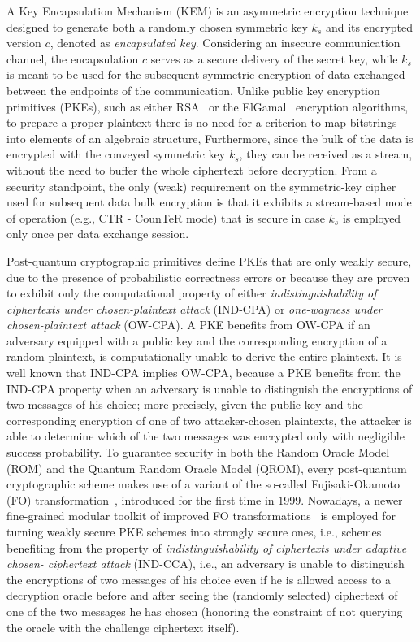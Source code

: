 A Key Encapsulation Mechanism (KEM) is an asymmetric encryption technique 
designed to generate both a randomly chosen symmetric key $k_s$ and its 
encrypted version $c$, denoted as {\em encapsulated key}. 
Considering an insecure communication channel, the encapsulation $c$ serves as 
a secure delivery of the secret key, while $k_s$ is meant to be used for the 
subsequent symmetric encryption of data exchanged between the endpoints of the 
communication.
Unlike public key encryption primitives (PKEs), such as either 
RSA~\cite{DBLP:journals/cacm/RivestSA78} or the 
ElGamal~\cite{DBLP:journals/tit/Elgamal85} encryption algorithms, to prepare a proper plaintext there is no need for a criterion to map bitstrings into 
elements of an algebraic structure,
Furthermore, since the bulk of the data is encrypted with the conveyed 
symmetric key $k_s$, they can be received as a stream, without the need to 
buffer the whole ciphertext before decryption. 
From a security standpoint, the only (weak) requirement on the symmetric-key 
cipher used for subsequent data bulk encryption is that it exhibits a 
stream-based mode of operation (e.g., CTR - CounTeR mode) that is secure in case $k_s$ is employed only once per data exchange session.

Post-quantum cryptographic primitives define PKEs that are only weakly secure, 
due to the presence of probabilistic correctness errors or because they are 
proven to exhibit only the computational property of either {\em indistinguishability of ciphertexts under chosen-plaintext attack} (IND-CPA) or 
{\em one-wayness under chosen-plaintext attack} (OW-CPA).
A PKE benefits from OW-CPA if an adversary equipped with a public key and the corresponding encryption of a random plaintext, is computationally unable to 
derive the entire plaintext.
It is well known that IND-CPA implies OW-CPA, because a PKE benefits from the 
IND-CPA property when an adversary is unable to distinguish the encryptions of 
two messages of his choice; more precisely, given the public key and the 
corresponding encryption of one of two attacker-chosen plaintexts, the 
attacker is able to determine which of the two messages was encrypted only 
with negligible success probability. 
%
To guarantee security in both the Random Oracle Model (ROM) and the Quantum Random 
Oracle Model (QROM), every post-quantum cryptographic scheme makes use of a variant 
of the so-called Fujisaki-Okamoto (FO) 
transformation~\cite{DBLP:conf/crypto/FujisakiO99}, introduced for the first 
time in $1999$.
Nowadays, a newer fine-grained modular toolkit of improved FO 
transformations~\cite{DBLP:conf/tcc/HofheinzHK17} is employed for turning weakly 
secure PKE schemes into strongly secure ones, i.e., schemes benefiting from the 
property of {\em indistinguishability of ciphertexts under adaptive chosen-
ciphertext attack} (IND-CCA), i.e., an adversary is unable to distinguish the 
encryptions of two messages of his choice even if he is allowed access to a 
decryption oracle before and after seeing the (randomly selected) ciphertext of one 
of the two messages he has chosen (honoring the constraint of not querying the 
oracle with the challenge ciphertext itself).
\vspace{-0.2cm}
